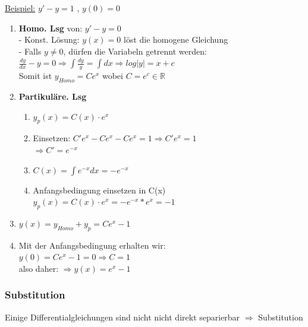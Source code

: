 \documentclass[6pt]{article}
\begin{document}
\begin{multicols*}{3}
	\vspace{3mm}
	\underline{Beispiel:} 	\hspace{5mm} 		$y' -y = 1$ , $y(0)=0$ \\
	\vspace{-5mm}
	\begin{enumerate}[label=(\roman*), itemsep=2pt, parsep=3pt ]
			\item {\bf Homo. Lsg} von: $y' - y = 0$ \\
					  - Konst. L{\"o}sung: $y(x)=0$ l{\"o}st die homogene Gleichung \vspace{0mm}\\
					  - Falls $y \not = 0$, d{\"u}rfen die Variabeln getrennt werden: \vspace{1mm}\\
					  $\frac{dy}{dx} -  y = 0 \Rightarrow \int \frac{dy}{y} = \int dx \Rightarrow log|y| = x + c$ \vspace{1mm}\\
					  Somit ist $y_{Homo} = Ce^x$ wobei $C = e^c\in \mathbb{R}$
			\item {\bf Partikul{\"a}re. Lsg} 
					\vspace{-2mm}
					\begin{enumerate}[itemsep=1pt, parsep=2pt]
						\item 	$y_p(x) = C(x) \cdot  e^x$
						\item 	Einsetzen: $C'e^x - Ce^x - Ce^x = 1 \Rightarrow C'e^x = 1$ \\
									$\Rightarrow C'  = e^{-x}$
						\item	$C(x) = \int e^{-x} dx = -e^{-x}$
						\item 	Anfangsbedingung einsetzen in C(x) \\
									$y_p(x) = C(x) \cdot  e^x = -e^{-x} * e^x  = -1$
					\end{enumerate}
					\vspace{-2mm}
			\item  $y(x) = y_{Homo} + y_p = Ce^x - 1$
			\item Mit der Anfangsbedingung erhalten wir:  \\
						$y(0)=Ce^x - 1 = 0 \Rightarrow C=1$  \vspace{2mm}\\ 
						also daher: $\Rightarrow y(x) = e^x -1 $
			
	\end{enumerate}
	
	
	\columnbreak
	\subsubsection*{Substitution}
	Einige Differentialgleichungen sind nicht nicht direkt separierbar $\Rightarrow$ Substitution 
	

\end{multicols*}
\end{document}
